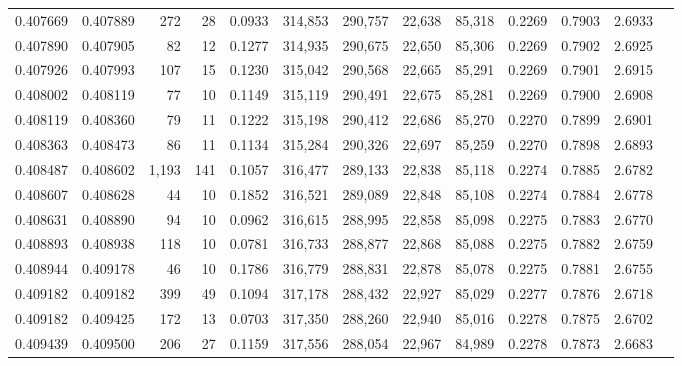 \begin{tabular}{rrrrrrrrrrrrr}
0.407669 & 0.407889 &   272 &  28 &                                     0.0933 & 314,853 & 290,757 &  22,638 &  85,318 & 0.2269 & 0.7903 & 2.6933 \\
0.407890 & 0.407905 &    82 &  12 &                                     0.1277 & 314,935 & 290,675 &  22,650 &  85,306 & 0.2269 & 0.7902 & 2.6925 \\
0.407926 & 0.407993 &   107 &  15 &                                     0.1230 & 315,042 & 290,568 &  22,665 &  85,291 & 0.2269 & 0.7901 & 2.6915 \\
0.408002 & 0.408119 &    77 &  10 &                                     0.1149 & 315,119 & 290,491 &  22,675 &  85,281 & 0.2269 & 0.7900 & 2.6908 \\
0.408119 & 0.408360 &    79 &  11 &                                     0.1222 & 315,198 & 290,412 &  22,686 &  85,270 & 0.2270 & 0.7899 & 2.6901 \\
0.408363 & 0.408473 &    86 &  11 &                                     0.1134 & 315,284 & 290,326 &  22,697 &  85,259 & 0.2270 & 0.7898 & 2.6893 \\
0.408487 & 0.408602 & 1,193 & 141 &                                     0.1057 & 316,477 & 289,133 &  22,838 &  85,118 & 0.2274 & 0.7885 & 2.6782 \\
0.408607 & 0.408628 &    44 &  10 &                                     0.1852 & 316,521 & 289,089 &  22,848 &  85,108 & 0.2274 & 0.7884 & 2.6778 \\
0.408631 & 0.408890 &    94 &  10 &                                     0.0962 & 316,615 & 288,995 &  22,858 &  85,098 & 0.2275 & 0.7883 & 2.6770 \\
0.408893 & 0.408938 &   118 &  10 &                                     0.0781 & 316,733 & 288,877 &  22,868 &  85,088 & 0.2275 & 0.7882 & 2.6759 \\
0.408944 & 0.409178 &    46 &  10 &                                     0.1786 & 316,779 & 288,831 &  22,878 &  85,078 & 0.2275 & 0.7881 & 2.6755 \\
0.409182 & 0.409182 &   399 &  49 &                                     0.1094 & 317,178 & 288,432 &  22,927 &  85,029 & 0.2277 & 0.7876 & 2.6718 \\
0.409182 & 0.409425 &   172 &  13 &                                     0.0703 & 317,350 & 288,260 &  22,940 &  85,016 & 0.2278 & 0.7875 & 2.6702 \\
0.409439 & 0.409500 &   206 &  27 &                                     0.1159 & 317,556 & 288,054 &  22,967 &  84,989 & 0.2278 & 0.7873 & 2.6683 \\

\end{tabular}
